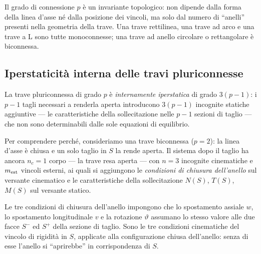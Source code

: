 





\begin{oss}
	Il grado di connessione $p$ è un invariante
	topologico: non dipende dalla forma della linea
	d'asse né dalla posizione dei vincoli, ma solo
	dal numero di ``anelli'' presenti nella geometria
	della trave. Una trave rettilinea, una trave
	ad arco e una trave a L sono tutte monoconnesse;
	una trave ad anello circolare o rettangolare è
	biconnessa.
\end{oss}

\subsection{Iperstaticità interna delle travi pluriconnesse}
\label{sec:ipestat_interna}

La trave pluriconnessa di grado $p$ è
\emph{internamente iperstatica} di grado $3(p-1)$:
i $p-1$ tagli necessari a renderla aperta
introducono $3(p-1)$ incognite statiche aggiuntive
--- le caratteristiche della sollecitazione nelle
$p-1$ sezioni di taglio --- che non sono
determinabili dalle sole equazioni di equilibrio.


Per comprendere perché, consideriamo una trave
biconnessa ($p = 2$): la linea d'asse è chiusa
e un solo taglio in $S$ la rende aperta. Il sistema
dopo il taglio ha ancora $n_c = 1$ corpo --- la
trave resa aperta --- con $n = 3$ incognite
cinematiche e $m_{\rm est}$ vincoli esterni, ai
quali si aggiungono le \emph{condizioni di chiusura
	dell'anello} sul versante cinematico e le
caratteristiche della sollecitazione $N(S)$, $T(S)$,
$M(S)$ sul versante statico.

Le tre condizioni di chiusura dell'anello impongono
che lo spostamento assiale $w$, lo spostamento
longitudinale $v$ e la rotazione $\vartheta$ assumano
lo stesso valore alle due facce $S^-$ ed $S^+$
della sezione di taglio. Sono le tre condizioni
cinematiche del vincolo di rigidità in $S$,
applicate alla configurazione chiusa dell'anello:
senza di esse l'anello si ``aprirebbe'' in
corrispondenza di $S$.

